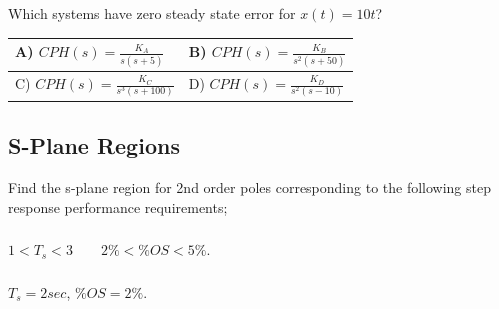 \documentclass{article}	%
\begin{document}



\subsection{}
  Which systems have zero steady state error for $x(t) = 10t$?\\[0.25in]

\begin{center}


\renewcommand\arraystretch{2.0}%
\begin{tabular}{|l|l|}  \hline
A) $CPH(s) = \frac{K_A}{s(s+5)}$		&	B) $CPH(s) = \frac{K_B}{s^2(s+50)}$   \\  \hline
C) $CPH(s) = \frac{K_C}{s^3(s+100)}$		&	D) $CPH(s) = \frac{K_D}{s^2(s-10)}$   \\  \hline
\end{tabular}
\end{center}

%
%
%
%


\subsection{S-Plane Regions}

  Find the s-plane region for 2nd order poles corresponding to the following step response performance requirements;


\subsubsection{}$1<T_s<3 \qquad 2\% < \%OS < 5\%$.



\subsubsection{} $T_s = 2sec$, $\%OS = 2\%$.
\end{document}
